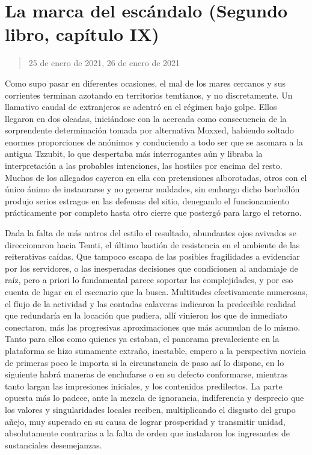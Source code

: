 \documentclass[
]{book}
\begin{document}
\hypertarget{la-marca-del-escuxe1ndalo-segundo-libro-capuxedtulo-ix}{%
\section{La marca del escándalo (Segundo libro, capítulo IX)}\label{la-marca-del-escuxe1ndalo-segundo-libro-capuxedtulo-ix}}

\begin{quote}
25 de enero de 2021, 26 de enero de 2021
\end{quote}

Como supo pasar en diferentes ocasiones, el mal de los mares cercanos y sus corrientes terminan azotando en territorios temtianos, y no discretamente. Un llamativo caudal de extranjeros se adentró en el régimen bajo golpe. Ellos llegaron en dos oleadas, iniciándose con la acercada como consecuencia de la sorprendente determinación tomada por alternativa Moxxed, habiendo soltado enormes proporciones de anónimos y conduciendo a todo ser que se asomara a la antigua Tzzubit, lo que despertaba más interrogantes aún y libraba la interpretación a las probables intenciones, las hostiles por encima del resto. Muchos de los allegados cayeron en ella con pretensiones alborotadas, otros con el único ánimo de instaurarse y no generar maldades, sin embargo dicho borbollón produjo serios estragos en las defensas del sitio, denegando el funcionamiento prácticamente por completo hasta otro cierre que postergó para largo el retorno.

Dada la falta de más antros del estilo el resultado, abundantes ojos avivados se direccionaron hacia Temti, el último bastión de resistencia en el ambiente de las reiterativas caídas. Que tampoco escapa de las posibles fragilidades a evidenciar por los servidores, o las inesperadas decisiones que condicionen al andamiaje de raíz, pero a priori lo fundamental parece soportar las complejidades, y por eso cuenta de lugar en el escenario que la busca. Multitudes efectivamente numerosas, el flujo de la actividad y las contadas calaveras indicaron la predecible realidad que redundaría en la locación que pudiera, allí vinieron los que de inmediato conectaron, más las progresivas aproximaciones que más acumulan de lo mismo. Tanto para ellos como quienes ya estaban, el panorama prevaleciente en la plataforma se hizo sumamente extraño, inestable, empero a la perspectiva novicia de primeras poco le importa si la circunstancia de paso así lo dispone, en lo siguiente habrá maneras de enchufarse o en su defecto conformarse, mientras tanto largan las impresiones iniciales, y los contenidos predilectos. La parte opuesta más lo padece, ante la mezcla de ignorancia, indiferencia y desprecio que los valores y singularidades locales reciben, multiplicando el disgusto del grupo añejo, muy superado en su causa de lograr prosperidad y transmitir unidad, absolutamente contrarias a la falta de orden que instalaron los ingresantes de sustanciales desemejanzas.
\end{document}
